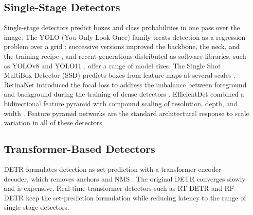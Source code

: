 \subsection{Single-Stage Detectors}
Single-stage detectors predict boxes and class probabilities in one pass over the image. The YOLO (You Only Look Once) family treats detection as a regression problem over a grid \cite{redmon2016yolo}; successive versions improved the backbone, the neck, and the training recipe \cite{redmon2018yolov3,bochkovskiy2020yolov4,ge2021yolox,wang2024yolov9}, and recent generations distributed as software libraries, such as YOLOv8 \cite{jocher2023yolov8} and YOLO11 \cite{jocher2024yolo11}, offer a range of model sizes. The Single Shot MultiBox Detector (SSD) predicts boxes from feature maps at several scales \cite{liu2016ssd}. RetinaNet introduced the focal loss to address the imbalance between foreground and background during the training of dense detectors \cite{lin2017focal}. EfficientDet combined a bidirectional feature pyramid with compound scaling of resolution, depth, and width \cite{tan2020efficientdet}. Feature pyramid networks \cite{lin2017fpn} are the standard architectural response to scale variation in all of these detectors.

\subsection{Transformer-Based Detectors}
DETR formulates detection as set prediction with a transformer encoder--decoder, which removes anchors and NMS \cite{carion2020detr}. The original DETR converges slowly and is expensive. Real-time transformer detectors such as RT-DETR \cite{zhao2024rtdetr} and RF-DETR \cite{robinson2025rfdetr} keep the set-prediction formulation while reducing latency to the range of single-stage detectors.


